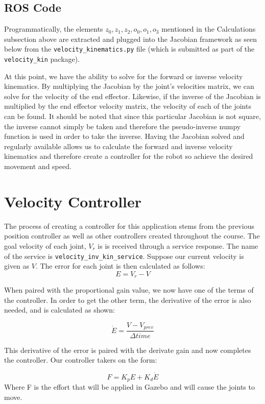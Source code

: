 \documentclass{article}
\begin{document}
\subsection{ROS Code}

Programmatically, the elements $z_0, z_1, z_2, o_0, o_1, o_3$ mentioned 
in the Calculations subsection above are extracted 
and plugged into the Jacobian framework as seen below from the 
\lstinline{velocity_kinematics.py} file (which is submitted as part of the 
\lstinline{velocity_kin} package).



At this point, we have the ability to solve for the forward or inverse velocity kinematics. By multiplying the Jacobian by the joint’s velocities matrix, we can solve for the velocity of the end effector. Likewise, if the inverse of the Jacobian is multiplied by the end effector velocity matrix, the velocity of each of the joints can be found. It should be noted that since this particular Jacobian is not square, the inverse cannot simply be taken and therefore the pseudo-inverse numpy function is used in order to take the inverse. Having the Jacobian solved and regularly available allows us to calculate the forward and inverse velocity kinematics and therefore create a controller for the robot so achieve the desired movement and speed.

\section{Velocity Controller}

The process of creating a controller for this application stems from the previous
position controller as well as other controllers created throughout the course.
The goal velocity of each joint, $V_r$ is is received through a service response.
The name of the service is \lstinline{velocity_inv_kin_service}. Suppose our current
velocity is given as $V$.
The error for each joint is then calculated as follows:
\[
    E = V_r - V
\]

When paired with the proportional gain value, we now have one of the terms of the controller. In order to get the other term, the derivative of the error is also needed, and is calculated as shown: 

\[
    \dot{E} = \frac{V - V_{prev}}{\Delta time}
\]

This derivative of the error is paired with the derivate gain and now completes the controller. Our controller takers on the form: 

\[
    F = K_p E + K_d \dot{E}
\]
Where F is the effort that will be applied in Gazebo and will cause the joints to move.
\end{document}
